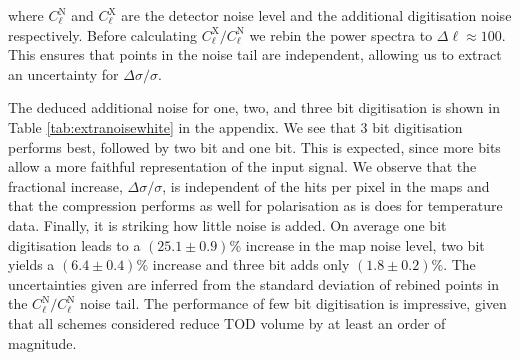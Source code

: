 \documentclass[apj]{emulateapj}
\begin{document}
where $C_\ell^{\mathrm{N}}$ and $C_\ell^\mathrm{X}$ are the detector noise level and the additional digitisation noise respectively. Before calculating $C_\ell^\mathrm{X}/C_\ell^\mathrm{N}$ we rebin the power spectra to $\Delta \ell \approx 100$. This ensures that points in the noise tail are independent, allowing us to extract an uncertainty for $\Delta \sigma / \sigma$.







The deduced additional noise for one, two, and three bit digitisation is shown in Table \ref{tab:extranoisewhite} in the appendix. We see that 3 bit digitisation performs best, followed by two bit and one bit. This is expected, since more bits allow a more faithful representation of the input signal. We observe that the fractional increase, $\Delta \sigma / \sigma$, is independent of the hits per pixel in the maps and that the compression performs as well for polarisation as is does for temperature data. Finally, it is striking how little noise is added. On average one bit digitisation leads to a $(25.1\pm 0.9)\%$ increase in the map noise level, two bit yields a $(6.4\pm0.4)\%$ increase and three bit adds only $(1.8\pm0.2)\%$. The uncertainties given are inferred from the standard deviation of rebined points in the $C_\ell^{\mathrm{N}}/C_\ell^{\mathrm{N}}$ noise tail. The performance of few bit digitisation is impressive, given that all schemes considered reduce TOD volume by at least an order of magnitude.
\end{document}
